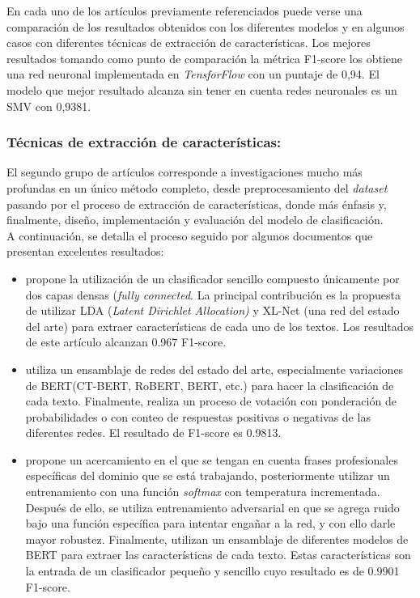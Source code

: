 En cada uno de los artículos previamente referenciados puede verse una comparación de los resultados obtenidos con los diferentes modelos y en algunos casos con diferentes técnicas de extracción de características. Los mejores resultados tomando como punto de comparación la métrica F1-score los obtiene una red neuronal implementada en \textit{TensforFlow} con un puntaje de 0,94. El modelo que mejor resultado alcanza sin tener en cuenta redes neuronales es un SMV con 0,9381. 

\subsubsection{Técnicas de extracción de características:}
El segundo grupo de artículos corresponde a investigaciones mucho más profundas en un único método completo, desde preprocesamiento del \textit{dataset} pasando por el proceso de extracción de características, donde más énfasis y, finalmente, diseño, implementación y evaluación del modelo de clasificación.\\ A continuación, se detalla el proceso seguido por algunos documentos que presentan excelentes resultados:

\begin{itemize}
    \item \cite{XLNetCovid} propone la utilización de un clasificador sencillo compuesto únicamente por dos capas densas (\textit{fully connected}. La principal contribución es la propuesta de utilizar LDA (\textit{Latent Dirichlet Allocation)} y XL-Net (una red del estado del arte) para extraer características de cada uno de los textos. Los resultados de este artículo alcanzan 0.967 F1-score.
        
    \item \cite{Heuristic} utiliza un ensamblaje de redes del estado del arte, especialmente variaciones de BERT(CT-BERT, RoBERT, BERT, etc.) para hacer la clasificación de cada texto. Finalmente, realiza un proceso de votación con ponderación de probabilidades o con conteo de respuestas positivas o negativas de las diferentes redes. El resultado de F1-score es 0.9813.
        
    \item \cite{TranformerBasedFineTuning} propone un acercamiento en el que se tengan en cuenta frases profesionales específicas del dominio que se está trabajando, posteriormente utilizar un entrenamiento con una función \textit{softmax} con temperatura incrementada. Después de ello, se utiliza entrenamiento adversarial en que se agrega ruido bajo una función específica para intentar engañar a la red, y con ello darle mayor robustez. Finalmente, utilizan un ensamblaje de diferentes modelos de BERT para extraer las características de cada texto. Estas características son la entrada de un clasificador pequeño y sencillo cuyo resultado es de 0.9901 F1-score.
\end{itemize}

